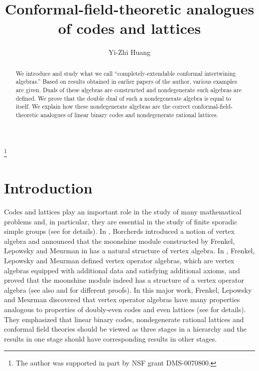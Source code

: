 \documentclass{amsproc}
\theoremstyle{definition}
\theoremstyle{remark}
\numberwithin{equation}{section}
\begin{document}
\title{Conformal-field-theoretic analogues of 
codes and lattices}


\author{Yi-Zhi Huang}

\address{Department of Mathematics, Rutgers University,
110 Frelinghuysen Rd., Piscataway, NJ 08854-8019}


\thanks{The author was supported in part 
by NSF grant DMS-0070800.}






\begin{abstract} 
We introduce and study what we call ``completely-extendable conformal
intertwining algebras.''  Based on 
results obtained in earlier papers of the author, various examples are given. 
Duals of these algebras are
constructed and nondegenerate such 
algebras are defined. We prove that the double dual of such a
nondegenerate  algebra is equal to itself. 
We explain how these
nondegenerate  algebras are
the correct conformal-field-theoretic analogues of linear binary codes
and nondegenerate rational lattices.  
\end{abstract}

\maketitle





\section{Introduction}

Codes and lattices play an important role in the study of many
mathematical problems and, in particular, they are essential in the study
of finite sporadic simple groups (see \cite{CN} for details). 
In \cite{B}, Borcherds introduced a notion of vertex algebra and
announced that the moonshine module constructed by 
Frenkel, Lepowsky and Meurman in \cite{FLM1} 
has a natural structure of vertex algebra. 
In \cite{FLM}, Frenkel, Lepowsky and Meurman defined
vertex operator algebras, which are vertex algebras equipped
with additional data and satisfying
additional axioms, and proved that the moonshine module
indeed has a structure of a vertex operator algebra (see also 
\cite{DGM} and \cite{H2} for different proofs).
In this major work, Frenkel, Lepowsky and Meurman
discovered that vertex operator algebras  have many properties 
analogous to properties of doubly-even codes and even
lattices (see \cite{FLM} for details). They emphasized that 
linear binary codes, nondegenerate 
rational lattices and conformal field theories should be viewed 
as three stages in  a hierarchy and the results in one stage should
have corresponding results in other stages.
\end{document}
